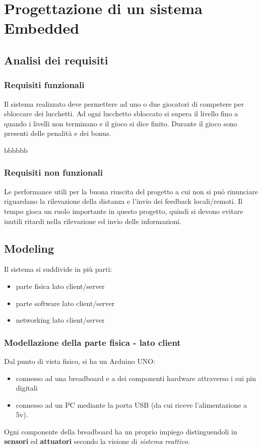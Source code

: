 \chapter{Progettazione di un sistema Embedded}
\section{Analisi dei requisiti}
\subsection{Requisiti funzionali}
Il sistema realizzato deve permettere ad uno o due giocatori di competere per sbloccare dei lucchetti. Ad ogni lucchetto sbloccato si supera il livello fino a quando i livelli non terminano e il gioco si dice finito. Durante il gioco sono presenti delle penalità e dei bonus.


bbbbbb
\subsection{Requisiti non funzionali}
Le performance utili per la buona riuscita del progetto a cui non si può rinunciare riguardano la rilevazione della distanza e l'invio dei feedback locali/remoti.
Il tempo gioca un ruolo importante in questo progetto, quindi si devono evitare inutili ritardi nella rilevazione ed invio delle informazioni.

\section{Modeling}
Il sistema si suddivide in più parti:
\begin{itemize}
	\item parte fisica lato client/server
	\item parte software lato client/server
	\item networking lato client/server
\end{itemize}

\subsection{Modellazione della parte fisica - lato client}
Dal punto di vista fisico, si ha un Arduino UNO:
 \begin{itemize}
 	\item connesso ad una breadboard e a dei componenti hardware attraverso i sui pin digitali
 	\item connesso ad un PC mediante la porta USB (da cui riceve l'alimentazione a 5v). 
 \end{itemize}
 Ogni componente della breadboard ha un proprio impiego distinguendoli in \textbf{sensori} ed \textbf{attuatori} secondo la visione di \textit{sistema reattivo}.

